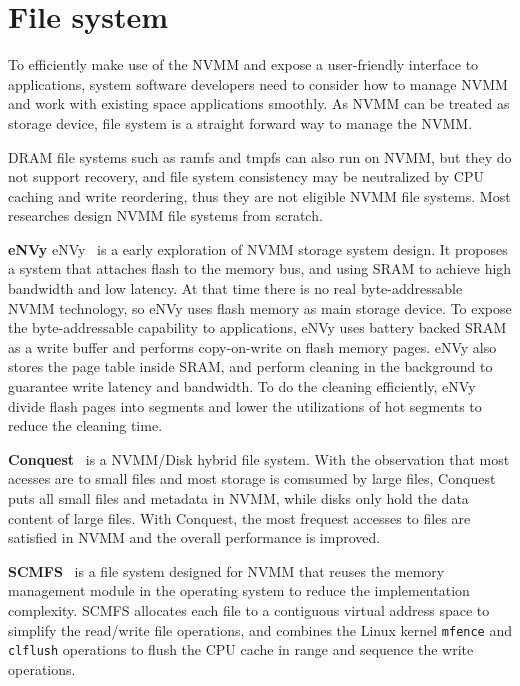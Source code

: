\section{File system} 
\label{sec:fs}

To efficiently make use of the NVMM and expose a user-friendly
interface to applications, system software developers need to consider
how to manage NVMM and work with existing space applications smoothly.
As NVMM can be treated as storage device, file system is a straight forward
way to manage the NVMM.

DRAM file systems such as ramfs and tmpfs can also run on NVMM, but they
do not support recovery, and file system consistency may be neutralized by
CPU caching and write reordering, thus they are not eligible NVMM file systems.
Most researches design NVMM file systems from scratch. 

\textbf{eNVy} eNVy~\cite{eNVy} is a early exploration of NVMM storage system
design. It proposes a system that attaches flash to the memory
bus, and using SRAM to achieve high bandwidth and low latency. At that time
there is no real byte-addressable NVMM technology, so eNVy uses flash memory
as main storage device. To expose the byte-addressable capability to 
applications, eNVy uses battery backed SRAM as a write buffer and performs
copy-on-write on flash memory pages. eNVy also stores the page table inside
SRAM, and perform cleaning in the background to guarantee write latency and
bandwidth. To do the cleaning efficiently, eNVy divide flash pages into
segments and lower the utilizations of hot segments to reduce the cleaning
time.


\textbf{Conquest}~\cite{conquest} is a NVMM/Disk hybrid file system.
With the observation that most acesses are to small files and most storage is
comsumed by large files, Conquest puts all small files and metadata in NVMM,
while disks only hold the data content of large files. With Conquest, the most
frequest accesses to files are satisfied in NVMM and the overall performance is
improved.

\textbf{SCMFS}~\cite{scmfs} is a file system designed for NVMM that
reuses the memory
management module in the operating system to reduce the implementation
complexity. SCMFS allocates 
each file to a contiguous virtual address space
to simplify the read/write file operations, and combines the Linux kernel
\texttt{mfence} and \texttt{clflush} operations to flush the CPU cache in
range and sequence the write operations.

